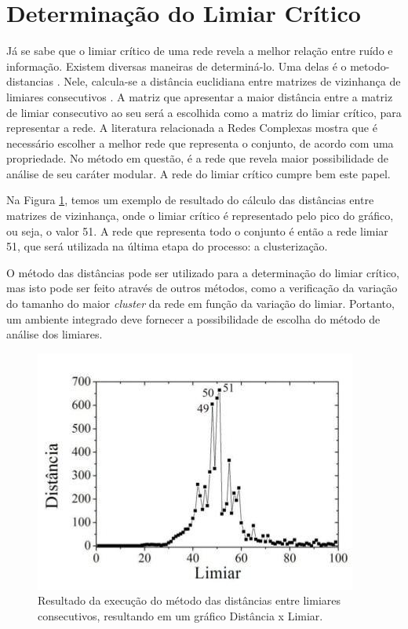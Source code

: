 \section{Determinação do Limiar Crítico} \label{sec:limcrit}


Já se sabe que o limiar crítico de uma rede revela a melhor relação entre ruído e informação. Existem diversas maneiras de determiná-lo.
Uma delas é o \gls{metodo-distancias} \cite{andrade2009}. Nele, calcula-se a distância euclidiana entre matrizes de
vizinhança de limiares consecutivos \cite{andrade2011}. A matriz que apresentar a maior distância entre a matriz de limiar consecutivo
ao seu será a escolhida como a matriz do limiar crítico, para representar a rede. A literatura relacionada a Redes Complexas mostra que é necessário
escolher a melhor rede que representa o conjunto, de acordo com uma propriedade. No método em questão, é a rede que revela maior possibilidade de
análise de seu caráter modular. A rede do limiar crítico cumpre bem este papel.

Na Figura \ref{fig:distancia}, temos um exemplo de resultado do cálculo das distâncias entre matrizes de vizinhança, onde o limiar crítico é representado
pelo pico do gráfico, ou seja, o valor 51. A rede que representa todo o conjunto é então a rede limiar 51, que será utilizada na última etapa do processo:
a clusterização.

O método das distâncias pode ser utilizado para a determinação do limiar crítico, mas isto pode ser feito através de outros métodos, como a verificação da
variação do tamanho do maior \textit{cluster} da rede em função da variação do limiar. Portanto, um ambiente integrado deve fornecer a possibilidade de
escolha do método de análise dos limiares.

\begin{figure}
\centering
\includegraphics[scale=0.58]{distancia}
\caption{Resultado da execução do método das distâncias entre limiares consecutivos, resultando em um gráfico Distância x Limiar.}
\label{fig:distancia}
\end{figure}

